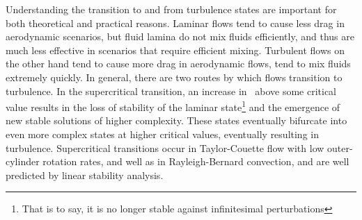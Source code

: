 Understanding the transition to and from turbulence states are important for both theoretical and practical reasons. Laminar flows tend to cause less drag in aerodynamic scenarios, but fluid lamina do not mix fluids efficiently, and thus are much less effective in scenarios that require efficient mixing. Turbulent flows on the other hand tend to cause more drag in aerodynamic flows, tend to mix fluids extremely quickly. In general, there are two routes by which flows transition to turbulence. In the supercritical transition, an increase in \ReN~above some critical value results in the loss of stability of the laminar state\footnote{That is to say, it is no longer stable against infinitesimal perturbations} and the emergence of new stable solutions of higher complexity. These states eventually bifurcate into even more complex states at higher critical values, eventually resulting in turbulence. Supercritical transitions occur in Taylor-Couette flow with low outer-cylinder rotation rates, and well as in Rayleigh-Bernard convection, and are well predicted by linear stability analysis. \\

